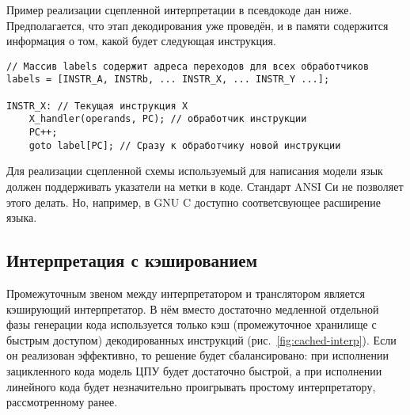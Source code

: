 Пример реализации сцепленной интерпретации в псевдокоде дан ниже. Предполагается, что этап декодирования уже проведён, и в памяти содержится информация о том, какой будет следующая инструкция.

\begin{lstlisting}
// Массив labels содержит адреса переходов для всех обработчиков
labels = [INSTR_A, INSTRb, ... INSTR_X, ... INSTR_Y ...]; 

INSTR_X: // Текущая инструкция X
    X_handler(operands, PC); // обработчик инструкции
    PC++;
    goto label[PC]; // Сразу к обработчику новой инструкции
\end{lstlisting}

Для реализации сцепленной схемы используемый для написания модели язык должен поддерживать указатели на метки в коде. Стандарт ANSI Си не позволяет этого делать. Но, например, в GNU C доступно соответсвующее расширение языка.

\subsection{Интерпретация с кэшированием}

Промежуточным звеном между интерпретатором и транслятором является кэширующий интерпретатор. В нём вместо достаточно медленной отдельной фазы генерации кода используется только кэш (промежуточное хранилище с быстрым доступом) декодированных инструкций (рис.~\ref{fig:cached-interp}). Если он реализован эффективно, то решение будет сбалансировано: при исполнении зацикленного кода модель ЦПУ будет достаточно быстрой, а при исполнении линейного кода будет незначительно проигрывать простому интерпретатору, рассмотренному ранее.

